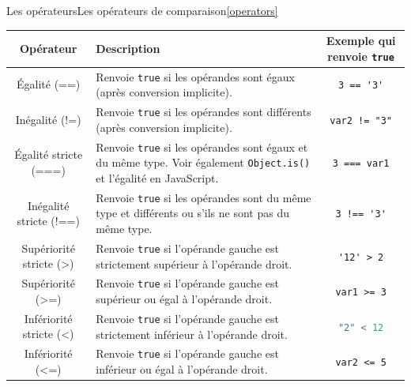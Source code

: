 \documentclass{beamer}
\begin{document}
    \begin{frame}{Les opérateurs}{Les opérateurs de comparaison\cref{operators}}
        \begin{tiny}
            \begin{table}[h!]
                \centering
                \begin{tabular}{|c|p{4cm}|c|}
                    \hline
                    \textbf{Opérateur}      & \textbf{Description}                                                                                                                     & \textbf{Exemple qui renvoie \lstinline{true}} \\
                    \hline
                    Égalité (==)            & Renvoie \lstinline{true} si les opérandes sont égaux (après conversion implicite). & \lstinline{3 == '3'}   \\
                    \hline
                    Inégalité (!=)          & Renvoie \lstinline{true} si les opérandes sont différents (après conversion implicite). & \lstinline{var2 != "3"} \\
                    \hline
                    Égalité stricte (===)   & Renvoie \lstinline{true} si les opérandes sont égaux et du même type. Voir également \lstinline{Object.is()} et l'égalité en JavaScript. & \lstinline{3 === var1} \\
                    \hline
                    Inégalité stricte (!==) & Renvoie \lstinline{true} si les opérandes sont du même type et différents ou s'ils ne sont pas du même type.  & \lstinline{3 !== '3'}        \\
                    \hline
                    Supériorité stricte (>) & Renvoie \lstinline{true} si l'opérande gauche est strictement supérieur à l'opérande droit.                   & \lstinline{'12' > 2}        \\
                    \hline
                    Supériorité (>=)        & Renvoie \lstinline{true} si l'opérande gauche est supérieur ou égal à l'opérande droit.                       & \lstinline{var1 >= 3}        \\
                    \hline
                    Infériorité stricte (<) & Renvoie \lstinline{true} si l'opérande gauche est strictement inférieur à l'opérande droit.                   & \lstinline[language=Javascript]!"2" < 12!        \\
                    \hline
                    Infériorité (<=)        & Renvoie \lstinline{true} si l'opérande gauche est inférieur ou égal à l'opérande droit.                       & \lstinline{var2 <= 5}        \\
                    \hline
                \end{tabular}
            \end{table}
        \end{tiny}
    \end{frame}
\end{document}
